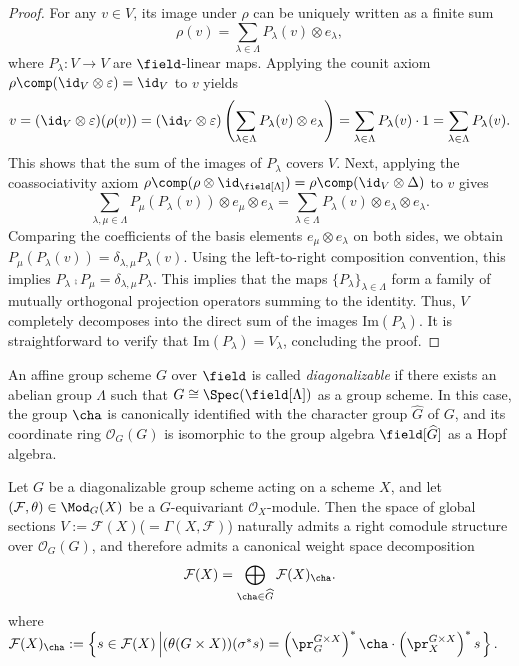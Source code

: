 \begin{proof}
For any $v \in V$, its image under $\rho$ can be uniquely written as a finite sum
$$
\rho(v) = \sum_{\lambda \in \Lambda} P_\lambda(v) \otimes e_\lambda,
$$
where $P_\lambda : V \rightarrow V$ are $\field$-linear maps.
Applying the counit axiom $\rho \comp (\id_V \otimes \varepsilon) = \id_V$ to $v$ yields
$$
v = (\id_V \otimes \varepsilon)(\rho(v)) = (\id_V \otimes \varepsilon)\left(\sum_{\lambda \in \Lambda} P_\lambda(v) \otimes e_\lambda\right) = \sum_{\lambda \in \Lambda} P_\lambda(v) \cdot 1 = \sum_{\lambda \in \Lambda} P_\lambda(v).
$$
This shows that the sum of the images of $P_\lambda$ covers $V$.
Next, applying the coassociativity axiom
$
\rho \comp (\rho \otimes \id_{\field[\Lambda]}) = \rho \comp (\id_V \otimes \Delta)
$
to $v$ gives
$$
\sum_{\lambda, \mu \in \Lambda} P_\mu(P_\lambda(v)) \otimes e_\mu \otimes e_\lambda = \sum_{\lambda \in \Lambda} P_\lambda(v) \otimes e_\lambda \otimes e_\lambda.
$$
Comparing the coefficients of the basis elements $e_\mu \otimes e_\lambda$ on both sides, we obtain $P_\mu(P_\lambda(v)) = \delta_{\lambda, \mu} P_\lambda(v)$.
Using the left-to-right composition convention, this implies $P_\lambda \comp P_\mu = \delta_{\lambda, \mu} P_\lambda$.
This implies that the maps $\{P_\lambda\}_{\lambda \in \Lambda}$ form a family of mutually orthogonal projection operators summing to the identity.
Thus, $V$ completely decomposes into the direct sum of the images $\mathrm{Im}(P_\lambda)$.
It is straightforward to verify that $\mathrm{Im}(P_\lambda) = V_\lambda$, concluding the proof.
\end{proof}



\begin{defn}
An affine group scheme $G$ over $\field$ is called \emph{diagonalizable} if there exists an abelian group $\Lambda$ such that
$G\cong\Spec(\field[\Lambda])$
as a group scheme. In this case, the group $\cha$ is canonically identified with the character group $\widehat{G}$ of $G$, and its coordinate ring $\mathcal{O}_G(G)$ is isomorphic to the group algebra $\field[\widehat{G}]$ as a Hopf algebra.
\end{defn}


\begin{lemma}
\label{lem:GlobalSectionDecomposition}
Let $G$ be a diagonalizable group scheme acting on a scheme $X$, and let $(\mathcal{F}, \theta) \in \Mod_G(X)$ be a $G$-equivariant $\mathcal{O}_X$-module.
Then the space of global sections $V := \mathcal{F}(X)$($=\Gamma(X, \mathcal{F})$) naturally admits a right comodule structure over $\mathcal{O}_G(G)$, and therefore admits a canonical weight space decomposition
$$
\mathcal{F}(X) = \bigoplus_{\cha \in \widehat{G}}
\mathcal{F}(X)_{\cha}.
$$
where
$
\mathcal{F}(X)_{\cha}
:=
\left\{
s \in \mathcal{F}(X)
\left|
(\theta(G\times X))(\sigma^* s)
=
\left(\pr_G^{G \times X}\right)^*\cha
\cdot
\left(\pr_X^{G \times X}\right)^* s
\right.\right\}.
$

\end{lemma}

